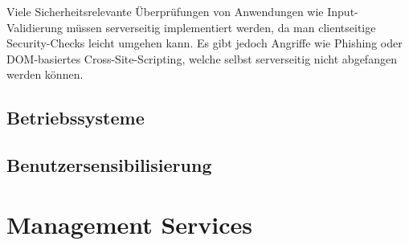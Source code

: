 Viele Sicherheitsrelevante Überprüfungen von Anwendungen wie Input-Validierung müssen serverseitig implementiert werden, da man clientseitige Security-Checks leicht umgehen kann. Es gibt jedoch Angriffe wie Phishing oder DOM-basiertes Cross-Site-Scripting, welche selbst serverseitig nicht abgefangen werden können. 

\subsection{Betriebssysteme}


\subsection{Benutzersensibilisierung}

\section{Management Services}




